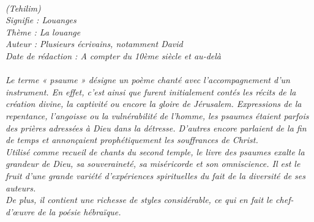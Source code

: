 \BFont
\noindent\hrulefill
{\footnotesize
\textit{
\bigskip
{\centering{}
\\(Tehilim)
\\Signifie : Louanges 
\\Thème : La louange
\\Auteur : Plusieurs écrivains, notamment David
\\Date de rédaction : A compter du 10ème siècle et au-delà\\}
}
\textit{
\\Le terme « psaume » désigne un poème chanté avec l’accompagnement d’un instrument. En effet, c’est ainsi que furent initialement contés les récits de la création divine, la captivité ou encore la gloire de Jérusalem. Expressions de la repentance, l’angoisse ou la vulnérabilité de l’homme, les psaumes étaient parfois des prières adressées à Dieu dans la détresse. D’autres encore parlaient de la fin de temps et annonçaient prophétiquement les souffrances de Christ.
\\Utilisé comme recueil de chants du second temple,  le livre des psaumes exalte la grandeur de Dieu, sa souveraineté, sa miséricorde et son omniscience. Il est le fruit d’une grande variété d’expériences spirituelles du fait de la diversité de ses auteurs. 
\\De plus, il contient une richesse de styles considérable, ce qui en fait le chef-d’œuvre de la poésie hébraïque.\bigskip
}
}
\par\nobreak\noindent\hrulefill
